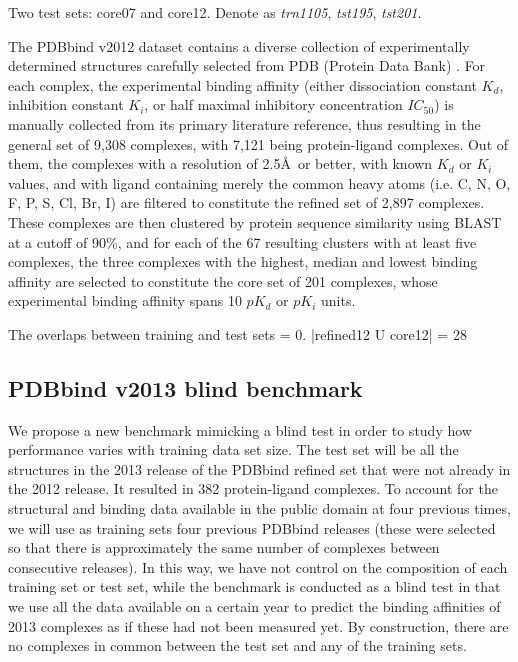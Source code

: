 \documentclass[journal=jacsat,manuscript=article]{achemso}
\begin{document}
Two test sets: core07 and core12. Denote as \textit{trn1105}, \textit{tst195}, \textit{tst201}.

The PDBbind v2012 dataset contains a diverse collection of experimentally determined structures carefully selected from PDB (Protein Data Bank) \cite{540,537}. For each complex, the experimental binding affinity (either dissociation constant $K_d$, inhibition constant $K_i$, or half maximal inhibitory concentration $IC_{50}$) is manually collected from its primary literature reference, thus resulting in the general set of 9,308 complexes, with 7,121 being protein-ligand complexes. Out of them, the complexes with a resolution of 2.5\AA\ or better, with known $K_d$ or $K_i$ values, and with ligand containing merely the common heavy atoms (i.e. C, N, O, F, P, S, Cl, Br, I) are filtered to constitute the refined set of 2,897 complexes. These complexes are then clustered by protein sequence similarity using BLAST at a cutoff of 90\%, and for each of the 67 resulting clusters with at least five complexes, the three complexes with the highest, median and lowest binding affinity are selected to constitute the core set of 201 complexes, whose experimental binding affinity spans 10 $pK_d$ or $pK_i$ units.

The overlaps between training and test sets = 0. |refined12 U core12| = 28

\subsection{PDBbind v2013 blind benchmark}

We propose a new benchmark mimicking a blind test in order to study how performance varies with training data set size. The test set will be all the structures in the 2013 release of the PDBbind refined set that were not already in the 2012 release. It resulted in 382 protein-ligand complexes. To account for the structural and binding data available in the public domain at four previous times, we will use as training sets four previous PDBbind releases (these were selected so that there is approximately the same number of complexes between consecutive releases). In this way, we have not control on the composition of each training set or test set, while the benchmark is conducted as a blind test in that we use all the data available on a certain year to predict the binding affinities of 2013 complexes as if these had not been measured yet. By construction, there are no complexes in common between the test set and any of the training sets. 
\end{document}
